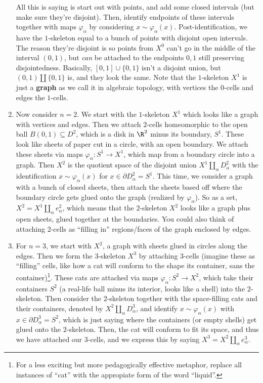 \begin{example}
\begin{enumerate}[label=(\arabic*)]
            All this is saying is start out with points, and add some closed intervals (but make sure they're disjoint). Then, identify endpoints of these intervals together with maps $\varphi _{\alpha }$ by considering $x\sim \varphi _{\alpha }(x)$. Post-identification, we have the $1$-skeleton equal to a bunch of points with disjoint open intervals. The reason they're disjoint is so points from $X^0$ can't go in the middle of the interval $(0,1)$, but \emph{can} be attached to the endpoints $0,1$ still preserving disjointedness. Basically, $[0,1]\cup \{0,1\} $ isn't a disjoint union, but $(0,1)\amalg \{0,1\} $ is, and they look the same. Note that the $1$-skeleton $X^1$ is just a \textbf{graph} as we call it in algebraic topology, with vertices the $0$-cells and edges the $1$-cells.
        \item Now consider $n=2$. We start with the $1$-skeleton $X^1$ which looks like a graph with vertices and edges. Then we attach $2$-cells homeomorphic to the open ball $B(0,1)\subseteq D^2$, which is a disk in $\R^2$ minus its boundary, $S^1 $. These look like sheets of paper cut in a circle, with an open boundary. We attach these sheets via maps $\varphi _{\alpha }\colon S^1  \to X^1$, which map from a boundary circle into a graph. Then $X^2$ is the quotient space of the disjoint union $X^1 \amalg_{\alpha }D_{\alpha }^2$ with the identification $x\sim \varphi _{\alpha }(x)$ for $x\in \partial D_{\alpha }^2=S^1 $. This time, we consider a graph with a bunch of closed sheets, then attach the sheets based off where the boundary circle gets glued onto the graph (realized by $\varphi _{\alpha }$). So as a set, $X^2=X^1 \amalg _{\alpha }e_{\alpha }^2         $, which means that the $2$-skeleton $X^2$ looks like a graph plus open sheets, glued together at the boundaries. You could also think of attaching $2$-cells as ``filling in'' regions/faces of the graph enclosed by edges.
        \item For $n=3$, we start with $X^2$, a graph with sheets glued in circles along the edges. Then we form the $3$-skeleton $X^3$ by attaching $3$-cells (imagine these as ``filling'' cells, like how a cat will conform to the shape its container, sans the container)\footnote{For a less exciting but more pedagogically effective metaphor, replace all instances of ``cat'' with the appropiate form of the word ``liquid''.}. These cats are attached via maps $\varphi _{\alpha }\colon S^2 \to X^2$, which take their containers $S^2$ (a real-life ball minus its interior, looks like a shell) into the $2$-skeleton. Then consider the $2$-skeleton together with the space-filling cats and their containers, denoted by $X^2\amalg_{\alpha }D_{\alpha }^3$, and identify $x\sim \varphi _{\alpha }(x)$ with $x\in \partial D_{\alpha }^3=S^2$, which is just saying where the containers (or empty shells) get glued onto the $2$-skeleton. Then, the cat will conform to fit its space, and thus we have attached our $3$-cells, and we express this by saying $X^3=X^2\amalg_{\alpha }e_{\alpha }^3$.

\end{enumerate}
\end{example}
